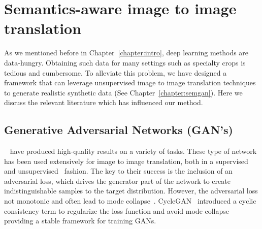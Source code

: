 \section{Semantics-aware image to image translation}\label{sec:relwork_semgan}
As we mentioned before in Chapter~\ref{chapter:intro}, deep learning methods are data-hungry. Obtaining such data for many settings such as specialty crops is tedious and cumbersome. To alleviate this problem, we have designed a framework that can leverage unsupervised image to image translation techniques to generate realistic synthetic data (See Chapter~\ref{chapter:semgan}). Here we discuss the relevant literature which has influenced our method.


\subsection{Generative Adversarial Networks (GAN's)}~\cite{goodfellow_generative_2014} have produced high-quality results on a variety of tasks. These type of network has been used extensively for image to image translation, both in a supervised~\cite{eigen_predicting_2015, isola_image--image_2016, wang_video--video_2018, xian_texturegan:_2018} and unsupervised~\cite{taigman_unsupervised_2016, zhu_unpaired_2017, yi_dualgan:_2017, gonzalez-garcia_image--image_2018, benaim_one-sided_2017, zhang_harmonic_2019, amodio_travelgan:_2019} fashion. The key to their success is the inclusion of an adversarial loss, which drives the generator part of the network to create indistinguishable samples to the target distribution. However, the adversarial loss not monotonic and often lead to mode collapse~\cite{arjovsky2017wasserstein}. CycleGAN~\cite{zhu_unpaired_2017} introduced a cyclic consistency term to regularize the loss function and avoid mode collapse providing a stable framework for training GANs.

